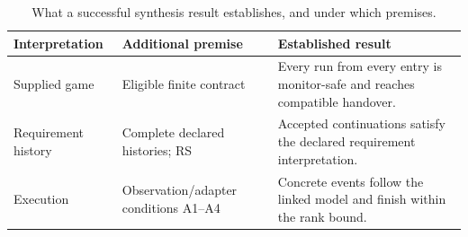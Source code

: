 \begin{table}[!htbp]
\caption{What a successful synthesis result establishes, and under which premises.}
\label{tab:guarantee-map}
\centering\small
\begin{tabular}{@{}p{.19\linewidth}p{.30\linewidth}p{.43\linewidth}@{}}\toprule
Interpretation & Additional premise & Established result\\\midrule
Supplied game & Eligible finite contract & Every run from every entry is monitor-safe and reaches compatible handover.\\
Requirement history & Complete declared histories; RS & Accepted continuations satisfy the declared requirement interpretation.\\
Execution & Observation/adapter conditions A1--A4 & Concrete events follow the linked model and finish within the rank bound.\\\bottomrule
\end{tabular}
\end{table}
